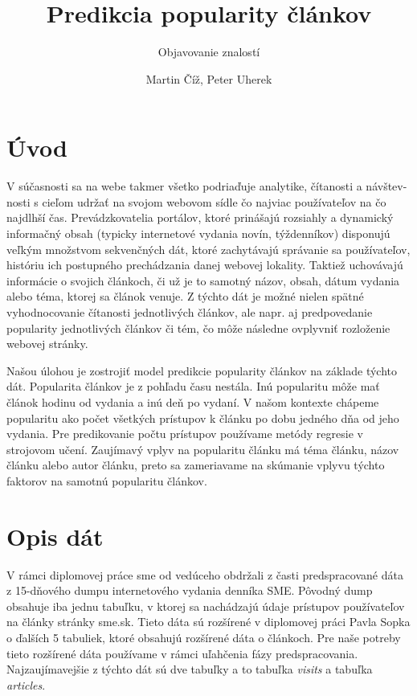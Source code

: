 \documentclass[runningheads,a4paper]{llncs}
\begin{document}
\title{Predikcia popularity článkov}
\subtitle{Objavovanie znalostí}
\author{Martin Číž, Peter Uherek}
\maketitle


\section{Úvod}
  V súčasnosti sa na webe takmer všetko podriaďuje analytike, čítanosti a 
návštev-nosti s cieľom udržať na svojom webovom sídle čo najviac používateľov na 
čo najdlhší čas. Prevádzkovatelia portálov, ktoré prinášajú rozsiahly a 
dynamický informačný obsah (typicky internetové vydania novín, týždenníkov) 
disponujú veľkým množstvom sekvenčných dát, ktoré zachytávajú správanie sa 
používateľov, históriu ich postupného prechádzania danej webovej lokality. 
Taktiež uchovávajú informácie o svojich článkoch, či už je to samotný názov, 
obsah, dátum vydania alebo téma, ktorej sa článok venuje. Z týchto dát je možné 
nielen spätné vyhodnocovanie čítanosti jednotlivých článkov, ale napr. aj 
predpovedanie popularity jednotlivých článkov či tém, čo môže následne ovplyvniť 
rozloženie webovej stránky. 

Našou úlohou je zostrojiť model predikcie popularity článkov na základe týchto dát.
Popularita článkov je z pohľadu času nestála. Inú popularitu môže mať článok hodinu od vydania a inú deň po vydaní.
V našom kontexte chápeme popularitu ako počet všetkých prístupov k článku po dobu jedného dňa od jeho vydania.
Pre predikovanie počtu prístupov používame metódy regresie v strojovom učení.
Zaujímavý vplyv na popularitu článku má téma článku, názov článku alebo autor článku, preto sa zameriavame na skúmanie vplyvu týchto faktorov na samotnú popularitu článkov.

\section{Opis dát}
V rámci diplomovej práce sme od vedúceho obdržali z časti predspracované dáta z 15-dňového dumpu internetového vydania denníka SME.
Pôvodný dump obsahuje iba jednu tabuľku, v ktorej sa nachádzajú údaje prístupov používateľov na články stránky sme.sk.
Tieto dáta sú rozšírené v diplomovej práci Pavla Sopka \cite{diplomovka} o ďalších 5 tabuliek, ktoré obsahujú rozšírené dáta o článkoch.
Pre naše potreby tieto rozšírené dáta používame v rámci uľahčenia fázy predspracovania.
Najzaujímavejšie z týchto dát sú dve tabuľky a to tabuľka {\em visits} a tabuľka {\em articles}.
\end{document}
